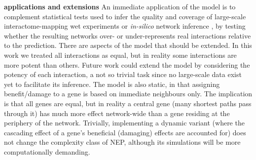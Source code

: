 \documentclass[12pt]{article}
\begin{document}
\textbf{applications and extensions} An immediate application of the model is to complement statistical tests used to infer the quality and coverage of large-scale interactome-mapping wet experiments \cite{rolland_proteome-scale_2014} or \textit{in-silico} network inference \cite{mitra_integrative_2013}, by testing whether the resulting networks over- or under-represents real interactions relative to the prediction. There are aspects of the model that should be extended. In this work we treated all interactions as equal, but in reality some interactions are more potent than others. Future work could extend the model by considering the potency of each interaction, a not so trivial task since no large-scale data exist yet to facilitate its inference. The model is also static, in  that assigning benefit/damage to a gene is based on immediate neighbours only. The implication is that all genes are equal, but in reality a central gene (many shortest paths pass through it) has much more effect network-wide than a gene residing at the periphery of the network. Trivially, implementing a dynamic variant (where the cascading effect of a gene's beneficial (damaging) effects are accounted for) does not change the complexity class of NEP, although its simulations will be more computationally demanding.
\end{document}

